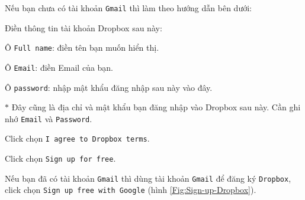 Nếu bạn chưa có tài khoản \verb|Gmail| thì làm theo hướng dẫn bên dưới:
\begin{list}{--}{}
\item Điền thông tin tài khoản Dropbox sau này:
\begin{list}{+}{}
\item Ô \verb|Full name|: điền tên bạn muốn hiển thị.
\item Ô \verb|Email|: điền Email của bạn.
\item Ô \verb|password|: nhập mật khẩu đăng nhập sau này vào đây.
\item[$\ast$] Đây cũng là địa chỉ và mật khẩu bạn đăng nhập vào Dropbox sau này. Cần ghi nhớ \verb|Email| và \verb|Password|.
\end{list}
\item Click chọn \verb|I agree to Dropbox terms|.
\item Click chọn \verb|Sign up for free|.
\end{list}
Nếu bạn đã có tài khoản \verb|Gmail| thì dùng tài khoản \verb|Gmail| để đăng ký \verb|Dropbox|, click chọn \verb|Sign up free with Google| (hình \ref{Fig:Sign-up-Dropbox}).
